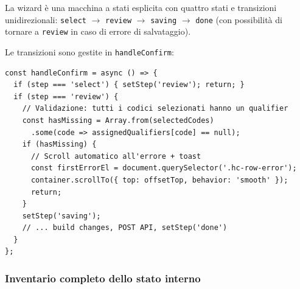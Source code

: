 \documentclass[a4paper,12pt]{article}
\begin{document}
\noindent La wizard \`{e} una macchina a stati esplicita con quattro stati e
transizioni unidirezionali: \texttt{select} $\rightarrow$ \texttt{review}
$\rightarrow$ \texttt{saving} $\rightarrow$ \texttt{done} (con possibilit\`{a}
di tornare a \texttt{review} in caso di errore di salvataggio).

Le transizioni sono gestite in \texttt{handleConfirm}:
\begin{lstlisting}
const handleConfirm = async () => {
  if (step === 'select') { setStep('review'); return; }
  if (step === 'review') {
    // Validazione: tutti i codici selezionati hanno un qualifier
    const hasMissing = Array.from(selectedCodes)
      .some(code => assignedQualifiers[code] == null);
    if (hasMissing) {
      // Scroll automatico all'errore + toast
      const firstErrorEl = document.querySelector('.hc-row-error');
      container.scrollTo({ top: offsetTop, behavior: 'smooth' });
      return;
    }
    setStep('saving');
    // ... build changes, POST API, setStep('done')
  }
};
\end{lstlisting}

\noindent \subsubsection{Inventario completo dello stato interno}
\end{document}
